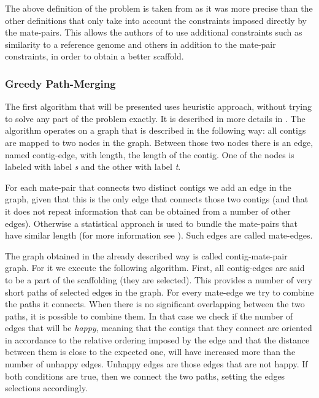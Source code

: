\documentclass[11pt]{article}
\begin{document}
The above definition of the problem is taken from \cite{grass} as it was more
precise than the other definitions that only take into account the constraints
imposed directly by the mate-pairs. This allows the authors of \cite{grass} to
use additional constraints such as similarity to a reference genome and others
in addition to the mate-pair constraints, in order to obtain a better scaffold.

\subsubsection{Greedy Path-Merging} %
\label{ssub:Greedy Path-Merging}
The first algorithm that will be presented uses heuristic approach, without
trying to solve any part of the problem exactly. It is described in more details
in \cite{greedy-path-merging}. The algorithm operates on a graph that is
described in the following way: all contigs are mapped to two nodes in the
graph. Between those two nodes there is an edge, named contig-edge, with length,
the length of the contig. One of the nodes is labeled with label \emph{s} and
the other with label \emph{t}.

For each mate-pair that connects two distinct contigs we add an edge in the
graph, given that this is the only edge that connects those two contigs (and that
it does not repeat information that can be obtained from a number of other
edges). Otherwise a statistical approach is used to bundle the mate-pairs that
have similar length (for more information see \cite{greedy-path-merging}). Such
edges are called mate-edges.

The graph obtained in the already described way is called contig-mate-pair
graph. For it we execute the following algorithm. First, all contig-edges are
said to be a part of the scaffolding (they are selected). This provides a number
of very short paths of selected edges in the graph. For every mate-edge we try
to combine the paths it connects. When there is no significant overlapping
between the two paths, it is possible to combine them. In that case we check if
the number of edges that will be \emph{happy}, meaning that the contigs that
they connect are oriented in accordance to the relative ordering imposed by the
edge and that the distance between them is close to the expected one, will have
increased more than the number of unhappy edges. Unhappy edges are those edges
that are not happy. If both conditions are true, then we connect the two paths,
setting the edges selections accordingly.
\end{document}
